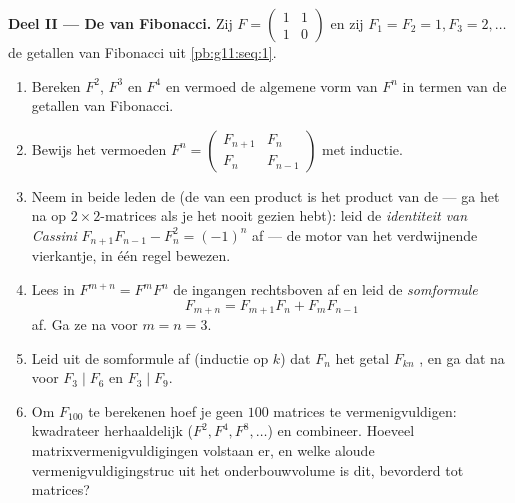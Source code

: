 \begin{problem}
\medskip
\noindent\textbf{Deel II --- De  van Fibonacci.}
Zij $F = \begin{pmatrix} 1 & 1\\ 1 & 0\end{pmatrix}$ en zij
$F_1 = F_2 = 1, F_3 = 2, \dots$ de getallen van Fibonacci uit
\cref{pb:g11:seq:1}.
\begin{enumerate}[resume]
  \item Bereken $F^2$, $F^3$ en $F^4$ en vermoed de algemene vorm van $F^n$ in
        termen van de getallen van Fibonacci.
  \item Bewijs het vermoeden
        $F^n = \begin{pmatrix} F_{n+1} & F_n\\ F_n & F_{n-1} \end{pmatrix}$
        met inductie.
  \item Neem in beide leden de  (de  van een product is
        het product van de  --- ga het na op
        $2 \times 2$-matrices als je het nooit gezien hebt): leid de
        \emph{identiteit van Cassini} $F_{n+1}F_{n-1} - F_n^2 = (-1)^n$ af ---
        de motor van het verdwijnende vierkantje, in één regel bewezen.
  \item Lees in $F^{m+n} = F^m F^n$ de ingangen rechtsboven af en leid de
        \emph{somformule}
        \[
        F_{m+n} = F_{m+1} F_n + F_m F_{n-1}
        \]
        af. Ga ze na voor $m = n = 3$.
  \item Leid uit de somformule af (inductie op $k$) dat $F_n$ het getal
        $F_{kn}$ , en ga dat na voor $F_3 \mid F_6$ en $F_3 \mid F_9$.
  \item Om $F_{100}$ te berekenen hoef je geen $100$ matrices te
        vermenigvuldigen: kwadrateer herhaaldelijk ($F^2, F^4, F^8, \dots$) en
        combineer. Hoeveel matrixvermenigvuldigingen volstaan er, en welke
        aloude vermenigvuldigingstruc uit het onderbouwvolume is dit, bevorderd
        tot matrices?
\end{enumerate}


\end{problem}
